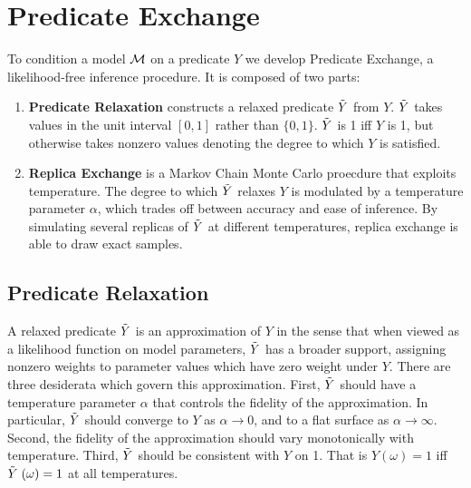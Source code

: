 \section{Predicate Exchange}
To condition a model ${\mathcal{M}}$ on a predicate $Y$ we develop Predicate Exchange, a likelihood-free inference procedure.  It is composed of two parts:
\begin{enumerate}
\item \textbf{Predicate Relaxation} constructs a relaxed predicate $\mathrel{\tilde{Y}}$ from $Y$. $\mathrel{\tilde{Y}}$ takes values in the unit interval $[0, 1]$ rather than $\{0, 1\}$.
$\mathrel{\tilde{Y}}$ is 1 iff $Y$ is 1, but otherwise takes nonzero values denoting the degree to which $Y$ is satisfied.
\item  \textbf{Replica Exchange} is a Markov Chain Monte Carlo proecdure that exploits temperature. The degree to which $\mathrel{\tilde{Y}}$ relaxes $Y$ is modulated by a temperature parameter $\alpha$, which trades off between accuracy and ease of inference.  By simulating several replicas of $\mathrel{\tilde{Y}}$ at different temperatures, replica exchange is able to draw exact samples. 
\end{enumerate}

\subsection{Predicate Relaxation}\label{predexchange}

A relaxed predicate $\mathrel{\tilde{Y}}$ is an approximation of $Y$ in the sense that when viewed as a likelihood function on model parameters, $\mathrel{\tilde{Y}}$ has a broader support, assigning nonzero weights to parameter values which have zero weight under $Y$.
There are three desiderata which govern this approximation.
First, $\mathrel{\tilde{Y}}$ should have a temperature parameter $\alpha$ that controls the fidelity of the approximation. In particular, $\mathrel{\tilde{Y}}$ should converge to $Y$ as $\alpha \to 0$, and to a flat surface as $\alpha \to \infty$. Second, the fidelity of the approximation should vary monotonically with temperature. Third, $\mathrel{\tilde{Y}}$ should be consistent with $Y$ on 1. That is $Y(\omega) = 1$ iff $\mathrel{\tilde{Y}}(\omega) = 1$ at all temperatures.  



